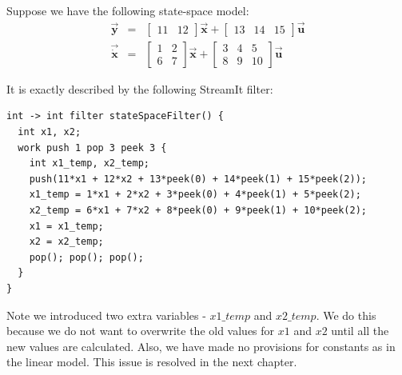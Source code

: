     Suppose we have the following state-space model:
\begin{eqnarray*}
\vec{\mathbf{y}} & = & \left [ \begin{array} {cc} 11 & 12
\end{array} \right ] \vec{\mathbf{x}} + \left [ \begin{array} {ccc} 13 & 14 & 15 \end{array} \right
 ] \vec{\mathbf{u}} \\
\vec{\dot{\mathbf{x}}} & = & \left [ \begin{array} {cc} 1 & 2 \\ 6
& 7 \end{array} \right ] \vec{\mathbf{x}} + \left [ \begin{array} {ccc} 3 & 4 & 5 \\
8 & 9 & 10 \end{array} \right ] \vec{\mathbf{u}}
\end{eqnarray*}

    It is exactly described by the following StreamIt filter:
\begin{scriptsize}
\begin{verbatim}
int -> int filter stateSpaceFilter() {
  int x1, x2;
  work push 1 pop 3 peek 3 {
    int x1_temp, x2_temp;
    push(11*x1 + 12*x2 + 13*peek(0) + 14*peek(1) + 15*peek(2));
    x1_temp = 1*x1 + 2*x2 + 3*peek(0) + 4*peek(1) + 5*peek(2);
    x2_temp = 6*x1 + 7*x2 + 8*peek(0) + 9*peek(1) + 10*peek(2);
    x1 = x1_temp;
    x2 = x2_temp;
    pop(); pop(); pop();
  }
}
\end{verbatim}
\end{scriptsize}

    Note we introduced two extra variables - $x1\_temp$ and $x2\_temp$.
We do this because we do not want to overwrite the old values for
$x1$ and $x2$ until all the new values are calculated. Also, we
have made no provisions for constants as in the linear model. This
issue is resolved in the next chapter.
